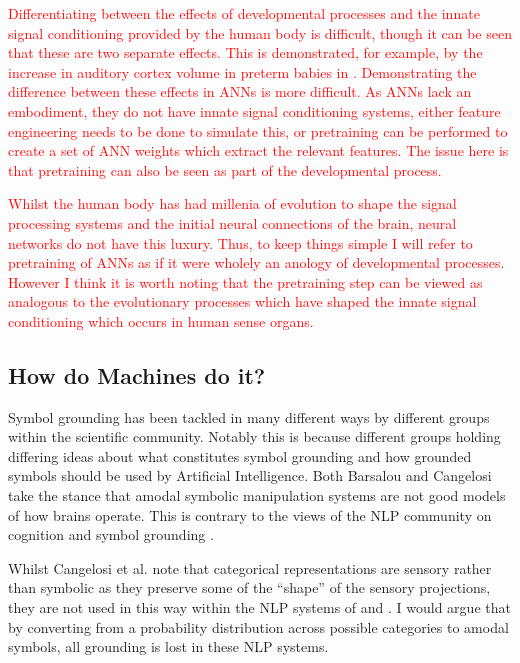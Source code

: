 \textcolor{red}{Differentiating between the effects of developmental processes and the innate signal conditioning provided by the human body is difficult, though it can be seen that these are two separate effects. This is demonstrated, for example, by the increase in auditory cortex volume in preterm babies in \cite{webb2015mother}. Demonstrating the difference between these effects in \acp{ANN} is more difficult. As \acp{ANN} lack an embodiment, they do not have innate signal conditioning systems, either feature engineering needs to be done to simulate this, or pretraining can be performed to create a set of \ac{ANN} weights which extract the relevant features. The issue here is that pretraining can also be seen as part of the developmental process.}

\textcolor{red}{Whilst the human body has had millenia of evolution to shape the signal processing systems and the initial neural connections of the brain, neural networks do not have this luxury. Thus, to keep things simple I will refer to pretraining of \acp{ANN} as if it were wholely an anology of developmental processes. However I think it is worth noting that the pretraining step can be viewed as analogous to the evolutionary processes which have shaped the innate signal conditioning which occurs in human sense organs.}

\subsection{How do Machines do it?}
Symbol grounding has been tackled in many different ways by different groups within the scientific community. Notably this is because different groups holding differing ideas about what constitutes symbol grounding and how grounded symbols should be used by Artificial Intelligence. Both Barsalou \cite{barsalou2008grounded} and Cangelosi \cite{cangelosi2000robotic} take the stance that amodal symbolic manipulation systems are not good models of how brains operate. This is contrary to the views of the \ac{NLP} community on cognition and symbol grounding \cite{lemonlearning, yu2017learning}.

Whilst Cangelosi et al. note that categorical representations are sensory rather than symbolic as they preserve some of the ``shape'' of the sensory projections, they are not used in this way within the \ac{NLP} systems of \cite{lemonlearning} and \cite{yu2017learning}. I would argue that by converting from a probability distribution across possible categories to amodal symbols, all grounding is lost in these \ac{NLP} systems.

